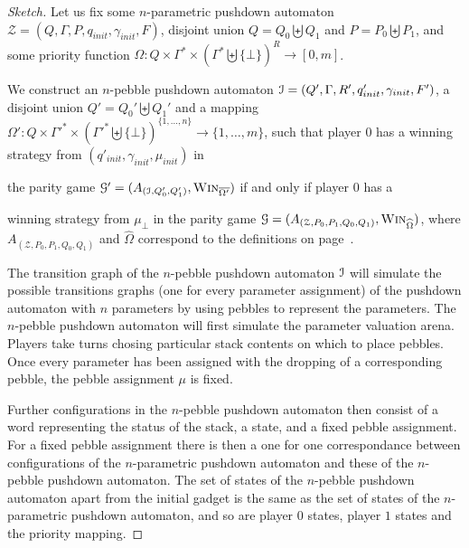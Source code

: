 \documentclass[a4paper,UKenglish,cleveref, autoref, thm-restate]{lipics-v2021}
\newcommand{\win}{\textsc{Win}}
\begin{document}
\begin{proof}[Sketch]


Let us fix some
$n$-parametric pushdown automaton $\mathcal{Z}= (Q, \Gamma, 
P%
, q_{init}, { \gamma_{init}} , F)$,
 disjoint
union $Q = Q_0  \biguplus Q_1$
and $P = P_0 \biguplus P_1$,
and
some priority function 
$\Omega : Q \times \Gamma^* \times ( \Gamma^* \biguplus \{ \bot \})^R \to [0, m ]$.


We construct
  an 
 $n$-pebble pushdown automaton $\mathcal{I} =(Q', \Gamma,  R', q_{init}', {\gamma_{init}} , F')$,
a 
 disjoint
union $Q' = Q_0'  \biguplus Q_1'$
and a mapping $\Omega' : Q \times  \Gamma'^* \times ( \Gamma'^* \biguplus \{ \bot \})^{\{1, \ldots, n\}} \to \{1, \ldots, m \}$,
such that
%
player $0$ has a winning strategy from 
$(q'_{init},\gamma_{init}, \mu_{init})$
in

the parity game
$\mathcal{G'}= (A_{(\ppda, Q'_0, Q'_1)}, \win_{\overline{\Omega'}})$
if and only if
player $0$ has a 

winning strategy from $\mu_\bot$ in 
the parity game
$\mathcal{G} =(A_{(\mathcal{Z}, P_0, P_1, Q_0 , Q_1)}, \win_{\widehat{\Omega}})$,
where		 
$A_{(\mathcal{Z}, P_0, P_1, Q_0 , Q_1)}$
and
$\widehat{\Omega}$
correspond to the definitions on page~\pageref{PPDA reachability game}.

%
%
%
%


The transition graph of the $n$-pebble pushdown automaton $\mathcal{I}$ will simulate the possible transitions graphs 
(one for every 
parameter assignment)
 of the pushdown automaton with $n$ parameters by using pebbles to represent the parameters. 
The $n$-pebble pushdown automaton will first simulate the 
parameter valuation arena.
Players take turns chosing particular stack contents on which to place pebbles. 
Once every parameter has been assigned with the dropping of a corresponding pebble, 
the pebble assignment $\mu$ is fixed.
%
%
%
%
%
%


Further configurations in the $n$-pebble pushdown automaton then consist of a word representing the status of the stack, a state, and a fixed pebble assignment. For a fixed pebble assignment there is then a one for one correspondance between configurations of the $n$-parametric pushdown 
automaton 
and these of the $n$-pebble pushdown automaton. The set of states of the $n$-pebble pushdown automaton apart from the initial gadget is the same as 
the set of states of the $n$-parametric pushdown automaton, and 
so are player $0$ states, player $1$ states and the priority mapping.
\end{proof}
\end{document}
